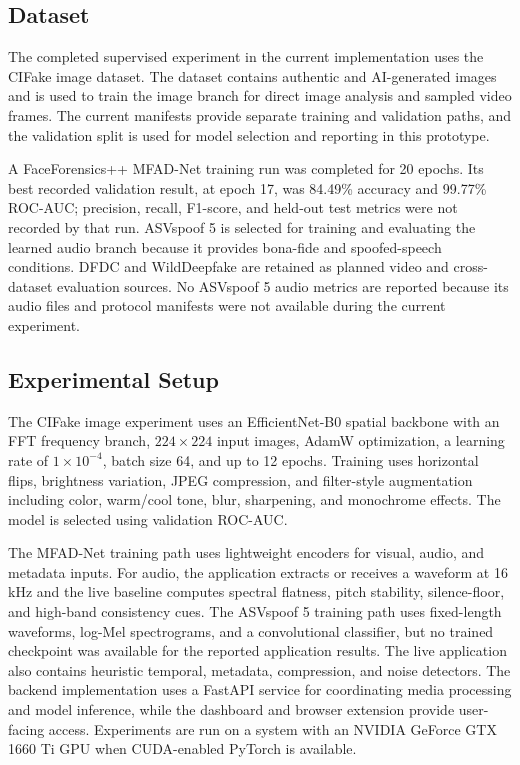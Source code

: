 \documentclass[conference]{IEEEtran}
\begin{document}
\subsection{Dataset}

The completed supervised experiment in the current implementation uses the CIFake image dataset. The dataset contains authentic and AI-generated images and is used to train the image branch for direct image analysis and sampled video frames. The current manifests provide separate training and validation paths, and the validation split is used for model selection and reporting in this prototype.

A FaceForensics++ MFAD-Net training run was completed for 20 epochs. Its best recorded validation result, at epoch 17, was 84.49\% accuracy and 99.77\% ROC-AUC; precision, recall, F1-score, and held-out test metrics were not recorded by that run. ASVspoof 5 is selected for training and evaluating the learned audio branch because it provides bona-fide and spoofed-speech conditions. DFDC and WildDeepfake are retained as planned video and cross-dataset evaluation sources. No ASVspoof 5 audio metrics are reported because its audio files and protocol manifests were not available during the current experiment.

\subsection{Experimental Setup}

The CIFake image experiment uses an EfficientNet-B0 spatial backbone with an FFT frequency branch, $224\times224$ input images, AdamW optimization, a learning rate of $1\times10^{-4}$, batch size 64, and up to 12 epochs. Training uses horizontal flips, brightness variation, JPEG compression, and filter-style augmentation including color, warm/cool tone, blur, sharpening, and monochrome effects. The model is selected using validation ROC-AUC.

The MFAD-Net training path uses lightweight encoders for visual, audio, and metadata inputs. For audio, the application extracts or receives a waveform at 16 kHz and the live baseline computes spectral flatness, pitch stability, silence-floor, and high-band consistency cues. The ASVspoof 5 training path uses fixed-length waveforms, log-Mel spectrograms, and a convolutional classifier, but no trained checkpoint was available for the reported application results. The live application also contains heuristic temporal, metadata, compression, and noise detectors. The backend implementation uses a FastAPI service for coordinating media processing and model inference, while the dashboard and browser extension provide user-facing access. Experiments are run on a system with an NVIDIA GeForce GTX 1660 Ti GPU when CUDA-enabled PyTorch is available.
\end{document}
